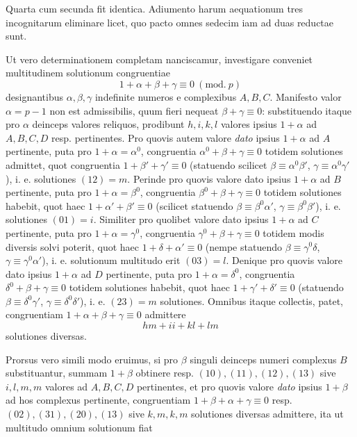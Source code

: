 %
Quarta cum secunda fit identica. Adiumento harum aequationum tres incognitarum eliminare licet, quo pacto omnes sedecim iam ad duas reductae sunt.

Ut vero determinationem completam nanciscamur, investigare conveniet multitudinem solutionum congruentiae
\[
1+\alpha+\beta+\gamma\equiv0\ (\mathrm{mod.}\ p)
\]
designantibus $\alpha,\beta,\gamma$ indefinite numeros e complexibus $A,B,C$. Manifesto valor $\alpha=p-1$ non est admissibilis, quum fieri nequeat $\beta+\gamma\equiv0$: substituendo itaque pro $\alpha$ deinceps valores reliquos, prodibunt $h,i,k,l$ valores ipsius $1+\alpha$ ad $A,B,C,D$ resp. pertinentes. Pro quovis autem valore \emph{dato} ipsius $1+\alpha$ ad $A$ pertinente, puta pro $1+\alpha=\alpha^0$, congruentia $\alpha^0+\beta+\gamma\equiv0$ totidem solutiones admittet, quot congruentia $1+\beta'+\gamma'\equiv0$ (statuendo scilicet $\beta\equiv\alpha^0\beta'$, $\gamma\equiv\alpha^0\gamma'$), i. e. solutiones $(12)=m$. Perinde pro quovis valore dato ipsius $1+\alpha$ ad $B$ pertinente, puta pro $1+\alpha=\beta^0$, congruentia $\beta^0+\beta+\gamma\equiv0$ totidem solutiones habebit, quot haec $1+\alpha'+\beta'\equiv0$ (scilicet statuendo $\beta\equiv\beta^0\alpha'$, $\gamma\equiv\beta^0\beta'$), i. e. solutiones $(01)=i$. Similiter pro quolibet valore dato ipsius $1+\alpha$ ad $C$ pertinente, puta pro $1+\alpha=\gamma^0$, congruentia $\gamma^0+\beta+\gamma\equiv0$ totidem modis diversis solvi poterit, quot haec $1+\delta+\alpha'\equiv0$ (nempe statuendo $\beta\equiv\gamma^0\delta$, $\gamma\equiv\gamma^0\alpha'$), i. e. solutionum multitudo erit $(03)=l$. Denique pro quovis valore dato ipsius $1+\alpha$ ad $D$ pertinente, puta pro $1+\alpha=\delta^0$, congruentia $\delta^0+\beta+\gamma\equiv0$ totidem solutiones habebit, quot haec $1+\gamma'+\delta'\equiv0$ (statuendo $\beta\equiv\delta^0\gamma'$, $\gamma\equiv\delta^0\delta'$), i. e. $(23)=m$ solutiones. Omnibus itaque collectis, patet, congruentiam $1+\alpha+\beta+\gamma\equiv0$ admittere
\[
hm+ii+kl+lm
\]
solutiones diversas.

Prorsus vero simili modo eruimus, si pro $\beta$ singuli deinceps numeri complexus $B$ substituantur, summam $1+\beta$ obtinere resp. $(10),(11),(12),(13)$ sive $i,l,m,m$ valores ad $A,B,C,D$ pertinentes, et pro quovis valore \emph{dato} ipsius $1+\beta$ ad hos complexus pertinente, congruentiam $1+\beta+\alpha+\gamma\equiv0$ resp. $(02),(31),(20),(13)$ sive $k,m,k,m$ solutiones diversas admittere, ita ut multitudo omnium solutionum fiat

